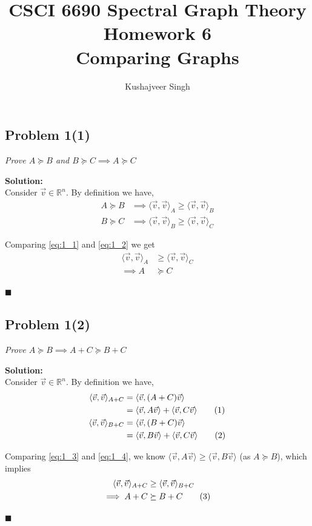 \documentclass[12pt,a4paper]{article}
\title{CSCI 6690 Spectral Graph Theory Homework 6\\Comparing Graphs}
\author{Kushajveer Singh}
\date{}
\newcommand\numberthis{\addtocounter{equation}{1}\tag{\theequation}}
\newcommand{\rightqed}{
\begin{flushright}
$\blacksquare$
\end{flushright}
}
\newcommand{\solution}{\noindent\textbf{Solution:}\\\indent}
\begin{document}
\maketitle

\subsection*{Problem 1(1)}
\textit{
    Prove $A \succeq B$ and $B \succeq C \implies A \succeq C$
}

\solution
Consider $\vec{v} \in \mathbb{R}^n$. By definition we have,
\begin{align}
    A \succeq B &\implies \langle \vec{v}, \vec{v} \rangle_A \geq \langle \vec{v}, \vec{v} \rangle_B \label{eq:1_1} \\
    B \succeq C &\implies \langle \vec{v}, \vec{v} \rangle_B \geq \langle \vec{v}, \vec{v} \rangle_C \label{eq:1_2}
\end{align}

Comparing \eqref{eq:1_1} and \eqref{eq:1_2} we get
\begin{align}
    \langle \vec{v}, \vec{v} \rangle_A &\geq \langle \vec{v}, \vec{v} \rangle_C \\
    \implies A &\succeq C
\end{align}
\rightqed

\subsection*{Problem 1(2)}
\textit{
    Prove $A \succeq B \implies A + C \succeq B + C$
}

\solution
Consider $\vec{v} \in \mathbb{R}^n$. By definition we have,
\begin{align*}
    \langle \vec{v}, \vec{v} \rangle_{A+C} &= \langle \vec{v}, (A+C)\vec{v} \rangle \\
    &= \langle \vec{v}, A\vec{v} \rangle + \langle \vec{v}, C\vec{v} \rangle \numberthis \label{eq:1_3} \\
    \langle \vec{v}, \vec{v} \rangle_{B+C} &= \langle \vec{v}, (B+C)\vec{v} \rangle \\
    &= \langle \vec{v}, B\vec{v} \rangle + \langle \vec{v}, C\vec{v} \rangle \numberthis \label{eq:1_4} \\
\end{align*}

Comparing \eqref{eq:1_3} and \eqref{eq:1_4}, we know $\langle \vec{v}, A\vec{v} \rangle \geq \langle \vec{v}, B\vec{v} \rangle$ (as $A\succeq B$), which implies
\begin{align*}
    \langle \vec{v}, \vec{v} \rangle_{A+C} &\geq \langle \vec{v}, \vec{v} \rangle_{B+C} \\
    \implies A + C &\succeq B + C \numberthis
\end{align*}
\rightqed
\end{document}
